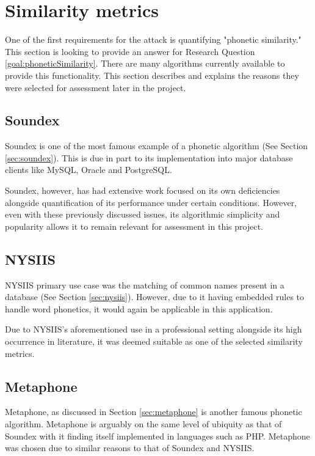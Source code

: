 \section{Similarity metrics}
\label{sec:metrics}
One of the first requirements for the attack is quantifying "phonetic similarity." This section is looking to provide an answer for Research Question \ref{goal:phoneticSimilarity}. There are many algorithms currently available to provide this functionality. This section describes and explains the reasons they were selected for assessment later in the project.

\subsection{Soundex}
Soundex is one of the most famous example of a phonetic algorithm (See Section \ref{sec:soundex}). This is due in part to its implementation into major database clients like MySQL\cite{mysql_soundex}, Oracle\cite{moved_2005} and PostgreSQL\cite{postgresql}.

Soundex, however, has had extensive work focused on its own deficiencies alongside quantification of its performance under certain conditions. However, even with these previously discussed issues, its algorithmic simplicity and popularity allows it to remain relevant for assessment in this project.

\subsection{NYSIIS}
NYSIIS primary use case was the matching of common names present in a database (See Section \ref{sec:nysiis}). However, due to it having embedded rules to handle word phonetics, it would again be applicable in this application.

Due to NYSIIS's aforementioned use in a professional setting alongside its high occurrence in literature, it was deemed suitable as one of the selected similarity metrics.

\subsection{Metaphone}
Metaphone, as discussed in Section \ref{sec:metaphone} is another famous phonetic algorithm. Metaphone is arguably on the same level of ubiquity as that of Soundex with it finding itself implemented in languages such as PHP\cite{php}. Metaphone was chosen due to similar reasons to that of Soundex and NYSIIS. 


